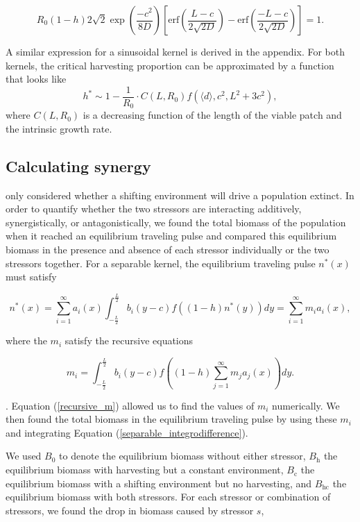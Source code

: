 \documentclass[12pt,english]{article}
\begin{document}
\begin{spacing}{1.9}
\begin{flushleft}
\[R_0(1-h)2\sqrt{2}\exp\left(\frac{-c^2}{8D}\right)\left[\text{erf}\left(\frac{L-c}{2\sqrt{2D}}\right)-\text{erf}\left(\frac{-L-c}{2\sqrt{2D}}\right)\right]=1.\]

A similar expression for a sinusoidal kernel is derived in the appendix.  For both kernels, the critical harvesting proportion can be approximated by a function that looks like 
\begin{equation*}
h^*\sim1- \frac{1}{R_0}\cdot C(L,R_0)f(\langle d \rangle,c^2,L^2+3c^2),
\end{equation*}
where $C(L,R_0)$ is a decreasing function of the length of the viable patch and the intrinsic growth rate.
   

\subsection{Calculating synergy }

\citet{ZhouKot2011} only considered whether a shifting environment will drive a population extinct.   In order to quantify whether the two stressors are interacting additively, synergistically, or antagonistically, we found the total biomass of the population when it reached an equilibrium traveling pulse and 
compared this equilibrium biomass in the presence and absence of each stressor individually or the two stressors together.  For a separable kernel, the equilibrium traveling pulse $n^*(x)$ must satisfy 

\begin{equation}
n^*(x)=\sum^\infty_{i=1}
a_i(x)\int^{\frac{L}{2}}_{-\frac{L}{2}}b_i(y-c)f((1-h)n^*(y))dy=\sum^\infty_{i=1}m_ia_i(x), \label{separable_integrodifference}
\end{equation}

\noindent where the $m_i$ satisfy the recursive equations

\begin{equation}
m_i=\int^{\frac{L}{2}}_{-\frac{L}{2}}b_i(y-c)f\left((1-h)\sum^\infty_{j=1}m_ja_j(x)\right)
dy. \label{recursive_m}
\end{equation}

\noindent \citep{Latore:1998fk}. Equation (\ref{recursive_m}) allowed us to find the values of $m_i$ numerically. We then found the total biomass in the 
equilibrium traveling pulse by using these $m_i$ and integrating Equation (\ref{separable_integrodifference}).


We used $B_0$ to denote the equilibrium biomass 
without either stressor, $B_\text{h}$ the equilibrium biomass with harvesting but a constant environment, $B_\text{c}$ the 
equilibrium biomass with a shifting environment but no harvesting, and $B_\text{hc}$ the equilibrium biomass with 
both stressors. For each stressor or combination of stressors, we found the drop in  biomass caused 
by stressor $s$,


\end{flushleft}
\end{spacing}
\end{document}
